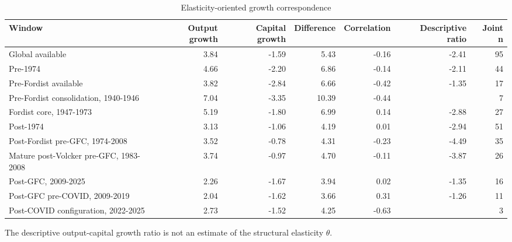 \begin{landscape}
\begin{table}[p]
\centering
\small
\caption{Elasticity-oriented growth correspondence}
\begin{tabular}{p{4.2cm}rrrrrr}
\toprule
Window & Output growth & Capital growth & Difference & Correlation & Descriptive ratio & Joint n\\
\midrule
Global available & 3.84 & -1.59 & 5.43 & -0.16 & -2.41 & 95
\\
Pre-1974 & 4.66 & -2.20 & 6.86 & -0.14 & -2.11 & 44
\\
Pre-Fordist available & 3.82 & -2.84 & 6.66 & -0.42 & -1.35 & 17
\\
Pre-Fordist consolidation, 1940-1946 & 7.04 & -3.35 & 10.39 & -0.44 &  & 7
\\
Fordist core, 1947-1973 & 5.19 & -1.80 & 6.99 & 0.14 & -2.88 & 27
\\
Post-1974 & 3.13 & -1.06 & 4.19 & 0.01 & -2.94 & 51
\\
Post-Fordist pre-GFC, 1974-2008 & 3.52 & -0.78 & 4.31 & -0.23 & -4.49 & 35
\\
Mature post-Volcker pre-GFC, 1983-2008 & 3.74 & -0.97 & 4.70 & -0.11 & -3.87 & 26
\\
Post-GFC, 2009-2025 & 2.26 & -1.67 & 3.94 & 0.02 & -1.35 & 16
\\
Post-GFC pre-COVID, 2009-2019 & 2.04 & -1.62 & 3.66 & 0.31 & -1.26 & 11
\\
Post-COVID configuration, 2022-2025 & 2.73 & -1.52 & 4.25 & -0.63 &  & 3
\\
\bottomrule
\end{tabular}
\par\vspace{0.3em}\footnotesize The descriptive output-capital growth ratio is not an estimate of the structural elasticity $\theta$.
\end{table}
\end{landscape}
